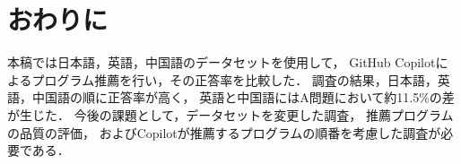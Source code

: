 \section{おわりに\label{conclusion}}
  本稿では日本語，英語，中国語のデータセットを使用して，
  GitHub Copilotによるプログラム推薦を行い，その正答率を比較した．
  調査の結果，日本語，英語，中国語の順に正答率が高く，
  英語と中国語にはA問題において約11.5\%の差が生じた．
  今後の課題として，データセットを変更した調査，
  推薦プログラムの品質の評価，
  およびCopilotが推薦するプログラムの順番を考慮した調査が必要である．
  
